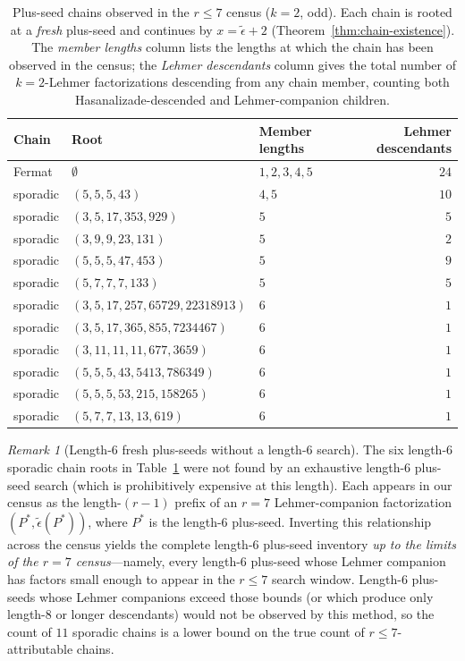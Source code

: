 \documentclass[11pt]{article}
\theoremstyle{definition}
\theoremstyle{remark}
\newtheorem{remark}[theorem]{Remark}
\newcommand{\eps}{\tilde{\epsilon}}
\begin{document}
\begin{table}[ht]
\centering
\caption{Plus-seed chains observed in the $r \le 7$ census ($k = 2$,
odd).  Each chain is rooted at a \emph{fresh} plus-seed and continues
by $x = \eps + 2$ (Theorem~\ref{thm:chain-existence}).  The
\emph{member lengths} column lists the lengths at which the chain has
been observed in the census; the \emph{Lehmer descendants} column
gives the total number of $k = 2$-Lehmer factorizations descending
from any chain member, counting both Hasanalizade-descended and
Lehmer-companion children.}
\label{tab:chains}
\smallskip
\begin{tabular}{@{}lllr@{}}
\toprule
Chain & Root & Member lengths & Lehmer descendants \\
\midrule
Fermat & $\emptyset$ & $1, 2, 3, 4, 5$ & $24$ \\
sporadic & $(5, 5, 5, 43)$ & $4, 5$ & $10$ \\
sporadic & $(3, 5, 17, 353, 929)$ & $5$ & $5$ \\
sporadic & $(3, 9, 9, 23, 131)$ & $5$ & $2$ \\
sporadic & $(5, 5, 5, 47, 453)$ & $5$ & $9$ \\
sporadic & $(5, 7, 7, 7, 133)$ & $5$ & $5$ \\
sporadic & $(3, 5, 17, 257, 65729, 22318913)$ & $6$ & $1$ \\
sporadic & $(3, 5, 17, 365, 855, 7234467)$ & $6$ & $1$ \\
sporadic & $(3, 11, 11, 11, 677, 3659)$ & $6$ & $1$ \\
sporadic & $(5, 5, 5, 43, 5413, 786349)$ & $6$ & $1$ \\
sporadic & $(5, 5, 5, 53, 215, 158265)$ & $6$ & $1$ \\
sporadic & $(5, 7, 7, 13, 13, 619)$ & $6$ & $1$ \\
\bottomrule
\end{tabular}
\end{table}

\begin{remark}[Length-$6$ fresh plus-seeds without a length-$6$ search]
The six length-$6$ sporadic chain roots in Table~\ref{tab:chains} were
not found by an exhaustive length-$6$ plus-seed search (which is
prohibitively expensive at this length).  Each appears in our census
as the length-$(r - 1)$ prefix of an $r = 7$ Lehmer-companion
factorization $(P^*, \eps(P^*))$, where $P^*$ is the length-$6$
plus-seed.  Inverting this relationship across the census yields the
complete length-$6$ plus-seed inventory \emph{up to the limits of the
$r = 7$ census}---namely, every length-$6$ plus-seed whose Lehmer
companion has factors small enough to appear in the $r \le 7$ search
window.  Length-$6$ plus-seeds whose Lehmer companions exceed those
bounds (or which produce only length-$8$ or longer descendants) would
not be observed by this method, so the count of $11$ sporadic chains
is a lower bound on the true count of $r \le 7$-attributable chains.
\end{remark}
\end{document}
